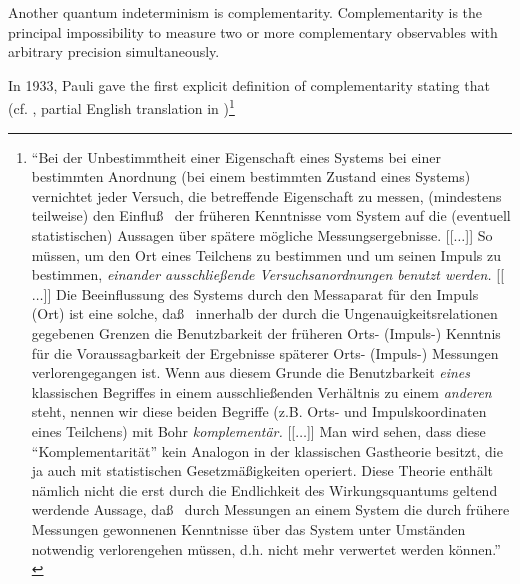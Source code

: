 \documentclass[rmp,amsfonts,showpacs,showkeys,twocolumn]{revtex4}
\begin{document}
Another quantum indeterminism is complementarity.
Complementarity is the principal impossibility to measure
two or more complementary observables
with arbitrary precision simultaneously.

In 1933, Pauli gave the first explicit definition of complementarity stating that (cf. \cite[p.~7]{pauli:58},
partial English translation in \cite[p.~369]{jammer:89})\footnote{
{  ``Bei der Unbestimmtheit einer Eigenschaft eines Systems bei einer bestimmten Anordnung
(bei einem bestimmten Zustand eines Systems) vernichtet jeder Versuch, die betreffende Eigenschaft zu messen,
(mindestens teilweise) den Einflu\ss~
der fr{\"u}heren Kenntnisse vom System auf die (eventuell statistischen) Aussagen
{\"u}ber sp{\"a}tere m{\"o}gliche Messungsergebnisse.
[[$\ldots$]]
So m{\"u}ssen, um den Ort eines Teilchens zu bestimmen und um seinen Impuls zu bestimmen,
{\em einander ausschlie\ss ende Versuchsanordnungen benutzt werden.}
[[$\ldots$]]
Die Beeinflussung des Systems durch den Messaparat f{\"u}r den Impuls (Ort)
ist eine solche, da\ss~ innerhalb der durch die Ungenauigkeitsrelationen gegebenen Grenzen
die Benutzbarkeit der fr{\"u}heren Orts- (Impuls-)
Kenntnis f{\"u}r die Voraussagbarkeit der Ergebnisse sp{\"a}terer Orts- (Impuls-) Messungen verlorengegangen ist.
Wenn aus diesem Grunde die Benutzbarkeit {\em eines} klassischen Begriffes in einem
ausschlie\ss enden Verh{\"a}ltnis zu einem {\em anderen} steht, nennen wir diese beiden Begriffe (z.B. Orts- und
Impulskoordinaten eines Teilchens) mit Bohr {\em komplement{\"a}r.}
[[$\ldots$]]
Man wird sehen, dass diese ``Komplementarit{\"a}t'' kein Analogon in
der klassischen Gastheorie besitzt, die ja auch mit statistischen
Gesetzm\"a\ss igkeiten operiert.
Diese Theorie enth{\"a}lt n{\"a}mlich nicht die erst durch die Endlichkeit des Wirkungsquantums
geltend werdende Aussage, da\ss~ durch Messungen an einem System die durch fr{\"u}here Messungen gewonnenen Kenntnisse
{\"u}ber das System unter Umst{\"a}nden notwendig verlorengehen m{\"u}ssen, d.h. nicht mehr verwertet werden k{\"o}nnen.''
}
}
\end{document}
